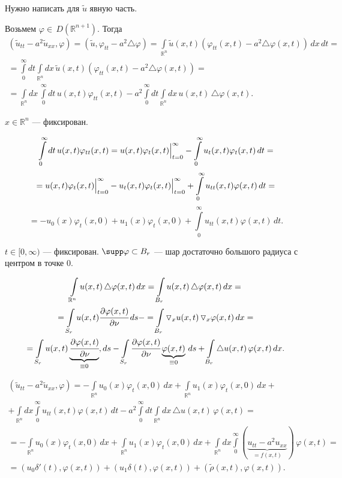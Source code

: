 \documentclass[unicode,12pt,draft]{article}
\begin{document}
Нужно написать для $\tilde u$ явную часть.

Возьмем $\varphi\in\,D(\mathbb R^{n+1}).$ Тогда
\begin{multline}
(\tilde u_{tt}-a^2\tilde u_{xx},\varphi)=(\tilde
u,\varphi_{tt}-a^2\triangle\varphi)= \int\limits_{\mathbb
R^n}\tilde
u(x,t)(\varphi_{tt}(x,t)-a^2\triangle\varphi(x,t))\,dx\,dt=\\=
\int\limits_0^{\infty}dt \int\limits_{\mathbb R^n}dx\,\tilde
u(x,t)(\varphi_{tt}(x,t)-a^2\triangle\varphi(x,t))=\\=
\int\limits_{\mathbb
R^n}dx\,\int\limits_0^{\infty}dt\,u(x,t)\varphi_{tt}(x,t)-
a^2\int\limits_0^{\infty}dt \int\limits_{\mathbb
R^n}dx\,u(x,t)\,\triangle\varphi(x,t).
\end{multline}

$x\in \mathbb R^n$ --- фиксирован.

$$\int\limits_0^{\infty}dt\,u(x,t)\varphi_{tt}(x,t)=
\Bigl.u(x,t)\varphi_{t}(x,t)\Bigr|_{t=0}^{\infty}-
\int\limits_0^{\infty}u_t(x,t)\varphi_{t}(x,t)\,dt=$$
$$=\Bigl.u(x,t)\varphi_{t}(x,t)\Bigr|_{t=0}^{\infty}-
\Bigl.u_t(x,t)\varphi_{t}(x,t)\Bigr|_{t=0}^{\infty}+
\int\limits_0^{\infty}u_{tt}(x,t)\varphi(x,t)\,dt=$$
$$=-u_0(x)\varphi_{t}(x,0)+u_1(x)\varphi_{t}(x,0)+
\int\limits_0^{\infty}u_{tt}(x,t)\varphi(x,t)\,dt.$$

$t\in [0,\infty)$ --- фиксирован. $\supp \varphi\subset B_r$  ---
шар достаточно большого радиуса с центром в точке 0.

\begin{multline}
\int\limits_{\mathbb R^n}u(x,t)\,\triangle\varphi(x,t)\,dx=
\int\limits_{B_r}u(x,t)\,\triangle\varphi(x,t)\,dx=\\=
\int\limits_{S_r}u(x,t)\cfrac{\partial \varphi(x,t)}{\partial
\nu}\,ds-=\int\limits_{B_r}\triangledown_x
u(x,t)\,\triangledown_x\varphi(x,t)\,dx=\\=
\int\limits_{S_r}u(x,t)\underbrace{\cfrac{\partial \varphi(x,t)}{\partial
\nu}}_{\equiv0},ds- \int\limits_{S_r}\cfrac{\partial
\varphi(x,t)}{\partial
\nu}\underbrace{\varphi(x,t)}_{\equiv0}\,ds+\int\limits_{B_r}\triangle
u(x,t)\,\varphi(x,t)\,dx.
\end{multline}

\begin{multline}
(\tilde u_{tt}-a^2\tilde u_{xx},\varphi)=
-\int\limits_{\mathbb
R^n}u_0(x)\varphi_t(x,0)\,dx+\int\limits_{\mathbb
R^n}u_1(x)\varphi_t(x,0)\,dx+\\+
\int\limits_{\mathbb R^n}dx
\int\limits_0^{\infty}u_{tt}(x,t)\varphi(x,t)\,dt-
a^2\int\limits_0^{\infty}dt \int\limits_{\mathbb R^n}dx\,\triangle
u(x,t)\,\varphi(x,t)=\\=
-\int\limits_{\mathbb
R^n}u_0(x)\varphi_t(x,0)\,dx+\int\limits_{\mathbb
R^n}u_1(x)\varphi_t(x,0)\,dx+\int\limits_{\mathbb R^n}dx
\int\limits_0^{\infty}(\underbrace{u_{tt}-a^2u_{xx}}_{=f(x,t)})\,\varphi(x,t)=\\=
(u_0\delta'(t),\varphi(x,t))+(u_1\delta(t),\varphi(x,t))+
(\tilde\rho(x,t),\varphi(x,t)).
\end{multline}
\end{document}
